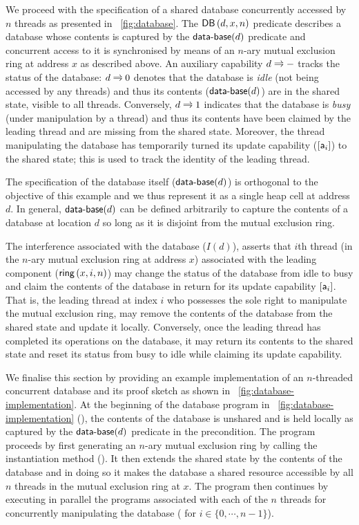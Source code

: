 We proceed with the specification of a shared database concurrently accessed by $n$ threads as presented in \fig~\ref{fig:database}. The $\textsf{DB}\left(d,x,n\right)$ predicate describes a database whose contents is captured by the $\textsf{data-base}(d)$ predicate and concurrent access to it is synchronised by means of an $n$-ary mutual exclusion ring at address $x$ as described above. An auxiliary capability $\dbtoken{d}{-}$ tracks the status of the database: $\dbtoken{d}{0}$ denotes that the database is \emph{idle} (not being accessed by any threads) and thus its contents ($\textsf{data-base}(d)$) are in the shared state, visible to all threads. Conversely, $\dbtoken{d}{1}$ indicates that the database is \emph{busy} (under manipulation by a thread) and thus its contents have been claimed by the leading thread and are missing from the shared state. Moreover, the thread manipulating the database has temporarily turned its update capability ($[\mathsf{a}_i]$) to the shared state; this is used to track the identity of the leading thread.

The specification of the database itself ($\textsf{data-base}(d)$) is orthogonal to the objective of this example and we thus represent it as a single heap cell at address $d$. In general, $\textsf{data-base}(d)$ can be defined arbitrarily to capture the contents of a database at location $d$  so long as it is disjoint from the mutual exclusion ring. 

The interference associated with the database ($I(d)$), asserts that $i$th thread (in the $n$-ary mutual exclusion ring at address $x$) associated with the leading component ($\textsf{ring}\left(x,i, n\right)$) may change the status of the database from idle to busy and claim the contents of the database in return for its update capability $[\mathsf{a}_i]$. That is, the leading thread at index $i$ who possesses the sole right to manipulate the mutual exclusion ring, may remove the contents of the database from the shared state and update it locally. Conversely, once the leading thread has completed its operations on the database, it may return its contents to the shared state and reset its status from busy to idle while claiming its update capability. 

We finalise this section by providing an example implementation of an $n$-threaded concurrent database and its proof sketch as shown in \fig~\ref{fig:database-implementation}. At the beginning of the database program in \fig~\ref{fig:database-implementation} (), the contents of the database is unshared and is held locally as captured by the $\textsf{data-base}(d)$ predicate in the precondition. The program proceeds by first generating an $n$-ary mutual exclusion ring by calling the instantiation method (). It then extends the shared state by the contents of the database and in doing so it makes the database a shared resource accessible by all $n$ threads in the mutual exclusion ring at $x$. The program then continues by executing in parallel the programs associated with each of the $n$ threads for concurrently manipulating the database ( for $i \in \{0,\cdots,n-1\}$). 


